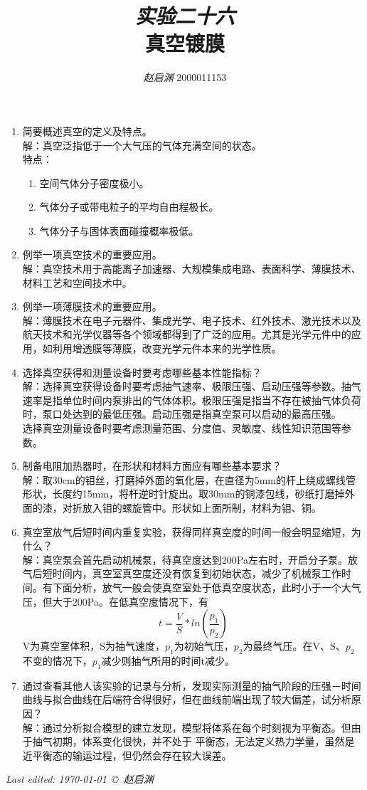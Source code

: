 \documentclass[a4paper,11pt]{article}
\title{\textit{\large 实验二十六}\\[2mm]
		\textbf{\LARGE 真空镀膜}}
\author{\textit{赵启渊} 2000011153}
\date{}
\begin{document}
	
	
\maketitle
\thispagestyle{fancy}
\begin{enumerate}
	\item 简要概述真空的定义及特点。\\
	解：真空泛指低于一个大气压的气体充满空间的状态。\\
	特点：
	\begin{enumerate}
		\item 空间气体分子密度极小。
		\item 气体分子或带电粒子的平均自由程极长。
		\item 气体分子与固体表面碰撞概率极低。
	\end{enumerate}
	
	
	\item 例举一项真空技术的重要应用。 \\
	解：真空技术用于高能离子加速器、大规模集成电路、表面科学、薄膜技术、材料工艺和空间技术中。
	
	\item 例举一项薄膜技术的重要应用。\\
	解：薄膜技术在电子元器件、集成光学、电子技术、红外技术、激光技术以及航天技术和光学仪器等各个领域都得到了广泛的应用。尤其是光学元件中的应用，如利用增透膜等薄膜，改变光学元件本来的光学性质。
	\item 选择真空获得和测量设备时要考虑哪些基本性能指标？\\
	解：选择真空获得设备时要考虑抽气速率、极限压强、启动压强等参数。抽气速率是指单位时间内泵排出的气体体积。极限压强是指当不存在被抽气体负荷时，泵口处达到的最低压强。启动压强是指真空泵可以启动的最高压强。\\
	选择真空测量设备时要考虑测量范围、分度值、灵敏度、线性知识范围等参数。
	\item 制备电阻加热器时，在形状和材料方面应有哪些基本要求？\\
	解：取30cm的钼丝，打磨掉外面的氧化层，在直径为5mm的杆上绕成螺线管形状，长度约15mm，将杆逆时针旋出。取30mm的铜漆包线，砂纸打磨掉外面的漆，对折放入钼的螺旋管中。形状如上面所制，材料为钼、铜。
	
	\item 真空室放气后短时间内重复实验，获得同样真空度的时间一般会明显缩短，为什么？\\
	解：真空泵会首先启动机械泵，待真空度达到200Pa左右时，开启分子泵。放气后短时间内，真空室真空度还没有恢复到初始状态，减少了机械泵工作时间。有下面分析，放气一般会使真空室处于低真空度状态，此时小于一个大气压，但大于200Pa。在低真空度情况下，有$$t = \dfrac{V}{S} * ln(\frac{p_1}{p_2})$$
	V为真空室体积，S为抽气速度，$p_1$为初始气压，$p_2$为最终气压。在V、S、$p_2$不变的情况下，$p_1$减少则抽气所用的时间t减少。
	\item 通过查看其他人该实验的记录与分析，发现实际测量的抽⽓阶段的压强－时间曲线与拟合曲线在后端符合得很好，但在曲线前端出现了较大偏差，试分析原因？\\
	解：通过分析拟合模型的建立发现，模型将体系在每个时刻视为平衡态。但由于抽气初期，体系变化很快，并不处于
	平衡态，⽆法定义热⼒学量，虽然是近平衡态的输运过程，但仍然会存在较⼤误差。
\end{enumerate}



	\vfill\noindent\itshape\footnotesize
	\hfill Last edited: \today\ \copyright\ 赵启渊
\end{document}
